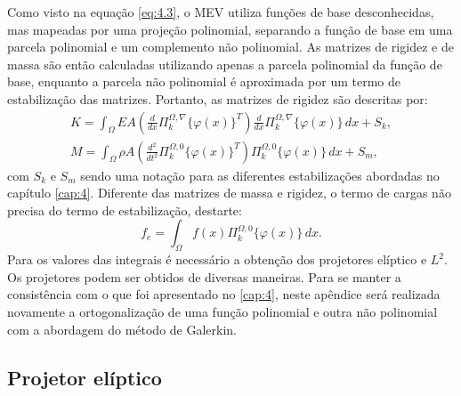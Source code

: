\indent Como visto na equação \ref{eq:4.3}, o MEV utiliza funções de base desconhecidas, mas mapeadas por uma projeção polinomial, separando a função de base em uma parcela polinomial e um complemento não polinomial. As matrizes de rigidez e de massa são então calculadas utilizando apenas a parcela polinomial da função de base, enquanto a parcela não polinomial é aproximada por um termo de estabilização das matrizes. Portanto, as matrizes de rigidez são descritas por:
\begin{equation}
    \begin{split}
        K = \int_{\Omega} EA \left(\frac{d}{dx}\Pi_k^{\Omega,\nabla}\{\varphi(x)\}^T\right) \frac{d}{dx}\Pi_k^{\Omega,\nabla}\{\varphi(x)\} \, dx + S_k, \\
        M = \int_{\Omega} \rho A \left(\frac{d^2}{dt^2}\Pi_k^{\Omega,0}\{\varphi(x)\}^T\right) \Pi_k^{\Omega,0}\{\varphi(x)\} \, dx + S_m,
    \end{split}
\end{equation}
com $S_k$ e $S_m$ sendo uma notação para as diferentes estabilizações abordadas no capítulo \ref{cap:4}. Diferente das matrizes de massa e rigidez, o termo de cargas não precisa do termo de estabilização, destarte:
\begin{equation}
    f_e = \int_{\Omega} f(x) \Pi_k^{\Omega,0} \{\varphi(x)\} \, dx.
\end{equation}
\indent Para os valores das integrais é necessário a obtenção dos projetores elíptico e $L^2$. Os projetores podem ser obtidos de diversas maneiras. Para se manter a consistência com o que foi apresentado no \ref{cap:4}, neste apêndice será realizada novamente a ortogonalização de uma função polinomial e outra não polinomial com a abordagem do método de Galerkin.

\subsection{Projetor elíptico}

